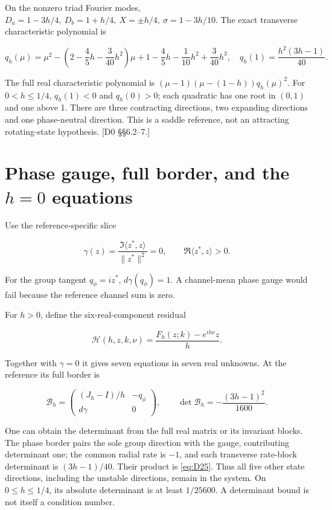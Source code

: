 \documentclass[11pt,a4paper]{article}
\begin{document}
On the nonzero triad Fourier modes,
\(D_a=1-3h/4,\ D_b=1+h/4,\ X=\pm h/4,\ \sigma=1-3h/10\).
The exact transverse characteristic polynomial is

\[
q_h(\mu)=\mu^2-\left(2-\frac45h-\frac3{40}h^2\right)\mu
+1-\frac45h-\frac1{10}h^2+\frac3{40}h^3,
\quad q_h(1)=\frac{h^2(3h-1)}{40}.
\tag{D22}\label{eq:D22}
\]

The full real characteristic polynomial is
\((\mu-1)(\mu-(1-h))q_h(\mu)^2\).
For \(0<h\le1/4\), \(q_h(1)<0\) and \(q_h(0)>0\); each quadratic has one root in \((0,1)\) and one above 1. There are three contracting directions, two expanding directions and one phase-neutral direction. This is a saddle reference, not an attracting rotating-state hypothesis. [D0 \S{}\S{}6.2--7.]

\section[Phase gauge, full border, and the h=0 equations]{Phase gauge, full border, and the \(h=0\) equations}

Use the reference-specific slice

\[
\gamma(z)=\frac{\Im\langle z^*,z\rangle}{\|z^*\|^2}=0,\qquad
\Re\langle z^*,z\rangle>0.
\tag{D23}\label{eq:D23}
\]

For the group tangent \(q_\phi=iz^*\), \(d\gamma(q_\phi)=1\). A channel-mean phase gauge would fail because the reference channel sum is zero.

For \(h>0\), define the six-real-component residual

\[
\mathcal H(h,z,k,\nu)=\frac{F_h(z;k)-e^{ih\nu}z}{h}.
\tag{D24}\label{eq:D24}
\]

Together with \(\gamma=0\) it gives seven equations in seven real unknowns. At the reference its full border is

\[
\mathcal B_h=
\begin{pmatrix}(J_h-I)/h&-q_\phi\\d\gamma&0\end{pmatrix},
\qquad
\boxed{\det\mathcal B_h=-\frac{(3h-1)^2}{1600}.}
\tag{D25}\label{eq:D25}
\]

One can obtain the determinant from the full real matrix or its invariant blocks. The phase border pairs the sole group direction with the gauge, contributing determinant one; the common radial rate is \(-1\), and each transverse rate-block determinant is \((3h-1)/40\). Their product is \eqref{eq:D25}. Thus all five other state directions, including the unstable directions, remain in the system. On \(0\le h\le1/4\), its absolute determinant is at least \(1/25600\). A determinant bound is not itself a condition number.
\end{document}
